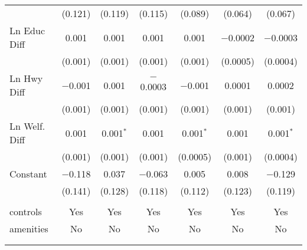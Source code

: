 \begin{table}[!htbp]
\begin{tabular}{@{\extracolsep{5pt}}lcccccc}
  & (0.121) & (0.119) & (0.115) & (0.089) & (0.064) & (0.067) \\ 
  Ln Educ Diff & 0.001 & 0.001 & 0.001 & 0.001 & $-$0.0002 & $-$0.0003 \\ 
  & (0.001) & (0.001) & (0.001) & (0.001) & (0.0005) & (0.0004) \\ 
  Ln Hwy Diff & $-$0.001 & 0.001 & $-$0.0003 & $-$0.001 & 0.0001 & 0.0002 \\ 
  & (0.001) & (0.001) & (0.001) & (0.001) & (0.001) & (0.001) \\ 
  Ln Welf. Diff & 0.001 & 0.001$^{*}$ & 0.001 & 0.001$^{*}$ & 0.001 & 0.001$^{*}$ \\ 
  & (0.001) & (0.001) & (0.001) & (0.0005) & (0.001) & (0.0004) \\ 
  Constant & $-$0.118 & 0.037 & $-$0.063 & 0.005 & 0.008 & $-$0.129 \\ 
  & (0.141) & (0.128) & (0.118) & (0.112) & (0.123) & (0.119) \\ 
 \hline \\[-1.8ex] 
controls & Yes & Yes & Yes & Yes & Yes & Yes \\ 
amenities & No & No & No & No & No & No \\ 
\hline \\[-1.8ex] 
\hline 
\hline \\[-1.8ex] 
\end{tabular} 
\end{table} 
